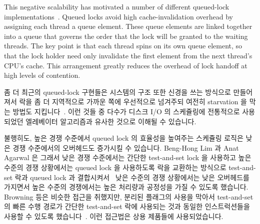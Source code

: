 This negative scalability has motivated a number of different
queued-lock
implementations~\cite{Anderson90,Graunke90,MellorCrummey91a,Wisniewski94,Craig93,Magnusson94,Takada93}.
Queued locks avoid high cache-invalidation overhead by assigning each
thread a queue element.
These queue elements are linked together into a queue that governs the
order that the lock will be granted to the waiting threads.
The key point is that each thread spins on its own queue element,
so that the lock holder need only invalidate the first element from
the next thread's CPU's cache.
This arrangement greatly reduces the overhead of lock handoff at high
levels of contention.
\fi

좀 더 최근의 queued-lock 구현들은 시스템의 구조 또한 신경을 쓰는 방식으로
만들어져서 락을 좀 더 지역적으로 가까운 쪽에 우선적으로 넘겨주되 여전히
starvation 을 막는 방법도
지킵니다~\cite{McKenney02e,radovic03hierarchical,radovic02efficient,BenJackson02,McKenney02d}.
이런 것들 중 다수가 디스크 I/O 의 스케쥴링에 전통적으로 사용되었던 엘레베이터
알고리즘과 유사한 것으로 이해될 수 있습니다.

불행히도, 높은 경쟁 수준에서 queued lock 의 효율성을 높여주는 스케쥴링 로직은
낮은 경쟁 수준에서의 오버헤드도 증가시킬 수 있습니다.
Beng-Hong Lim 과 Anat Agarwal 은 그래서 낮은 경쟁 수준에서는 간단한
test-and-set lock 을 사용하고 높은 수준의 경쟁 상황에서는 queued lock 을
사용하도록 락을 교환하는 방식으로 test-and-set 락과 queued lock 과
결합시켜서~\cite{BengHongLim94} 낮은 수준의 경쟁 상황에서는 낮은 오버헤드를
가지면서 높은 수준의 경쟁에서는 높은 처리량과 공정성을 가질 수 있도록 했습니다.
Browning 등은 비슷한 접근을 취했지만, 분리된 플래그의 사용을 막아서
test-and-set 의 빠른 수행 경로가 간단한 test-and-set 락에 사용되는 것과 동일한
인스트럭션들을 사용할 수 있도록
했습니다~\cite{LukeBrowning2005SimpleLockNUMAAware}.
이런 접근법은 상용 제품들에 사용되었습니다.

